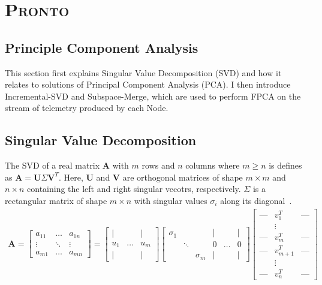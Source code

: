 \section{\protect\textsc{Pronto}}

\subsection{Principle Component Analysis}
This section first explains Singular Value Decomposition (SVD) and how it
relates to solutions of Principal Component Analysis (PCA). I then introduce
Incremental-SVD and Subspace-Merge, which are used to perform FPCA on the stream
of telemetry produced by each Node.

\subsection{Singular Value Decomposition}
The SVD of a real matrix $\mathbf{A}$ with $m$ rows and $n$ columns where $m
\geq n$ is defines as $\mathbf{A} = \mathbf{U}\Sigma\mathbf{V}^T$. Here, $\mathbf{U}$ and
$\mathbf{V}$ are orthogonal matrices of shape $m \times m$ and $n \times n$
containing the left and right singular vecotrs, respectively. $\Sigma$ is a
rectangular matrix of shape $m \times n$ with singular values $\sigma_i$ along
its diagonal~\cite{Strang2009}.
\begin{align}
\mathbf{A} = \begin{bmatrix} a_{11} & \dots & a_{1n} \\ \vdots & \ddots & \vdots
    \\ a_{m1} & \dots & a_{mn} \end{bmatrix} = \begin{bmatrix} \mid & & \mid \\ u_1 & \ldots & u_m
\\ \mid & & \mid  \end{bmatrix} \begin{bmatrix} \sigma_1 & &  & \mid & & \mid \\ &
\ddots & & 0 & \ldots & 0 \\ & & \sigma_m & \mid & & \mid  \end{bmatrix} \begin{bmatrix}
    \text{---} & v_1^T & \text{---} \\ & \vdots & \\ \text{---} & v_m^T & \text{---} \\
    \text{---} & v_{m+1}^T & \text{---} \\ & \vdots  & \\ \text{---} & v_n^T & \text{---}
\end{bmatrix}
\end{align}

